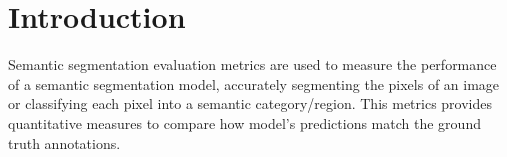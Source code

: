 \section{Introduction}

  Semantic segmentation evaluation metrics are used to measure the performance of
  a semantic segmentation model, accurately segmenting the pixels of an image or
  classifying each pixel into a semantic category/region. This metrics provides
  quantitative measures to compare how model's predictions match the ground truth
  annotations\cite{goodfellow2016deep, intelligence2021modern}.
